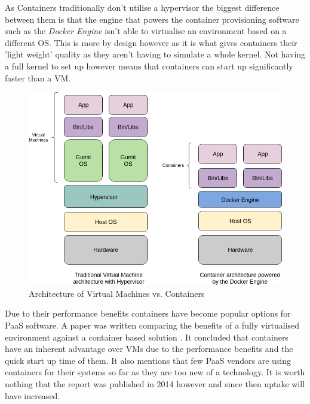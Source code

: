 As Containers traditionally don't utilise a hypervisor the biggest difference between them is that the engine that powers the container provisioning software such as the \textit{Docker Engine} isn't able to virtualise an environment based on a different OS. This is more by design however as it is what gives containers their 'light weight' quality as they aren't having to simulate a whole kernel. Not having a full kernel to set up however means that containers can start up significantly faster than a VM.

\begin{figure}[h!]
    \centering
    \includegraphics[scale=0.4]{res/Virtualisation.png}
    \caption{Architecture of Virtual Machines vs. Containers}
    \label{fig:architecture}
\end{figure}

Due to their performance benefits containers have become popular options for PaaS software. A paper was written comparing the benefits of a fully virtualised environment against a container based solution \cite{contsvsvirt}. It concluded that containers have an inherent advantage over VMs due to the performance benefits and the quick start up time of them. It also mentions that few PaaS vendors are using containers for their systems so far as they are too new of a technology. It is worth nothing that the report was published in 2014 however and since then uptake will have increased.

\pagebreak
